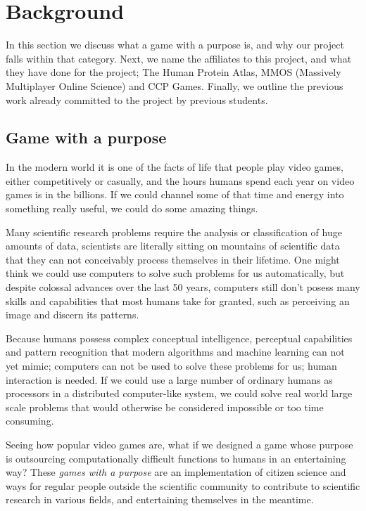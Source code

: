 \section{Background}\label{sec:background}
	In this section we discuss what a game with a purpose is, and why our project falls within that category. Next, we name the affiliates to this project, and what they have done for the project; The Human Protein Atlas, MMOS (Massively Multiplayer Online Science) and CCP Games. Finally, we outline the previous work already committed to the project by previous students.

\subsection{Game with a purpose}
	In the modern world it is one of the facts of life that people play video games, either competitively or casually, and the hours humans spend each year on video games is in the billions. If we could channel some of that time and energy into something really useful, we could do some amazing things.

	Many scientific research problems require the analysis or classification of huge amounts of data, scientists are literally sitting on mountains of scientific data that they can not conceivably process themselves in their lifetime. One might think we could use computers to solve such problems for us automatically, but despite colossal advances over the last 50 years, computers still don't posess many skills and capabilities that most humans take for granted, such as perceiving an image and discern its patterns.

	Because humans possess complex conceptual intelligence, perceptual capabilities and pattern recognition that modern algorithms and machine learning can not yet mimic; computers can not be used to solve these problems for us; human interaction is needed. If we could use a large number of ordinary humans as processors in a distributed computer-like system, we could solve real world large scale problems that would otherwise be considered impossible or too time consuming.

	Seeing how popular video games are, what if we designed a game whose purpose is outsourcing computationally difficult functions to humans in an entertaining way? These \emph{games with a purpose} are an implementation of citizen science and ways for regular people outside the scientific community to contribute to scientific research in various fields, and entertaining themselves in the meantime.

